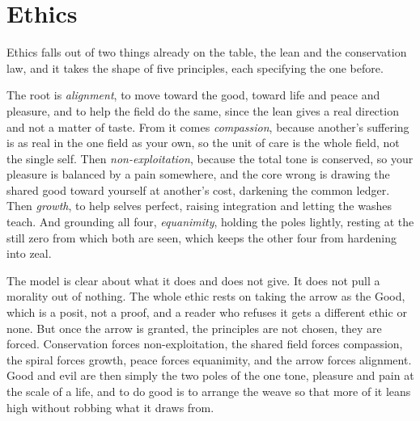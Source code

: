 \section{Ethics}

Ethics falls out of two things already on the table, the lean and the conservation law, and it takes the shape of five principles, each specifying the one before.

The root is \emph{alignment}, to move toward the good, toward life and peace and pleasure, and to help the field do the same, since the lean gives a real direction and not a matter of taste. From it comes \emph{compassion}, because another's suffering is as real in the one field as your own, so the unit of care is the whole field, not the single self. Then \emph{non-exploitation}, because the total tone is conserved, so your pleasure is balanced by a pain somewhere, and the core wrong is drawing the shared good toward yourself at another's cost, darkening the common ledger. Then \emph{growth}, to help selves perfect, raising integration and letting the washes teach. And grounding all four, \emph{equanimity}, holding the poles lightly, resting at the still zero from which both are seen, which keeps the other four from hardening into zeal.

The model is clear about what it does and does not give. It does not pull a morality out of nothing. The whole ethic rests on taking the arrow as the Good, which is a posit, not a proof, and a reader who refuses it gets a different ethic or none. But once the arrow is granted, the principles are not chosen, they are forced. Conservation forces non-exploitation, the shared field forces compassion, the spiral forces growth, peace forces equanimity, and the arrow forces alignment. Good and evil are then simply the two poles of the one tone, pleasure and pain at the scale of a life, and to do good is to arrange the weave so that more of it leans high without robbing what it draws from.
